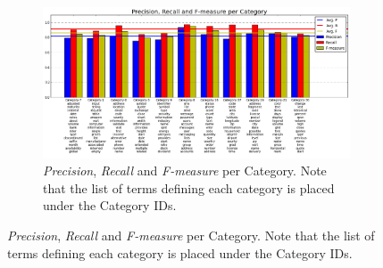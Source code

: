 \begin{figure}
\begin{figure}[H]
\begin{center}
\includegraphics[scale=0.52]{images/PRFvsC}
\caption{\textit{Precision}, \textit{Recall} and \textit{F-measure} per Category. Note that the list of terms defining each category is placed under the Category IDs.}
\label{prf-vs-c} 
\end{center}
\end{figure}
\end{figure}



